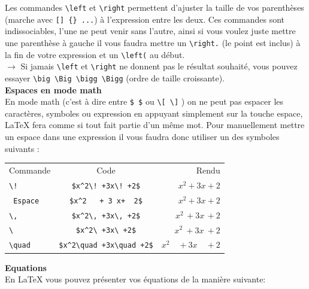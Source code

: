 \documentclass[11pt]{article}				%
\begin{document}
Les commandes \verb|\left| et \verb|\right| permettent d'ajuster la taille de vos parenthèses (marche avec \verb|[] {} ...|) à l'expression entre les deux. Ces commandes sont indissociables, l'une ne peut venir sans l'autre, ainsi si vous voulez juste mettre une parenthèse à gauche il vous faudra mettre un \verb|\right.| (le point est inclus) à la fin de votre expression et un \verb|\left(| au début.\\

$\rightarrow$ Si jamais \verb|\left| et \verb|\right| ne donnent pas le résultat souhaité, vous pouvez essayer \verb|\big \Big \bigg \Bigg| (ordre de taille croissante).\\


\textbf{Espaces en mode math}\\

En mode math (c'est à dire entre \verb|$ $| ou \verb|\[ \]| ) on ne peut pas espacer les caractères, symboles ou expression en appuyant simplement sur la touche espace, LaTeX fera comme si tout fait partie d'un même mot. Pour manuellement mettre un espace dans une expression il vous faudra donc utiliser un des symboles suivants :\\

\begin{center}
	\begin{tabular}{lcr}
	
	Commande & Code   &  Rendu \\ 
	
	\verb|\!|  & \verb|$x^2\! +3x\! +2$| & $ x^2\! +3x\! +2$   \\ 
	 
	\verb| Espace |&\verb|$x^2   + 3 x+  2$|  & $x^2+3x+2$ \\ 
	 
	 \verb|\,| & \verb|$x^2\, +3x\, +2$| & $x^2\, +3x\, +2$ \\ 
	 
	 
	 \verb|\ | & \verb|$x^2\ +3x\ +2$| &  $x^2\ +3x\ +2$ \\ 
	 
	\verb|\quad | & \verb|$x^2\quad +3x\quad +2$| & $x^2\quad +3x\quad +2$  
\end{tabular}
\end{center} 

\textbf{Equations}\\

En LaTeX vous pouvez présenter vos équations de la manière suivante:
\end{document}
